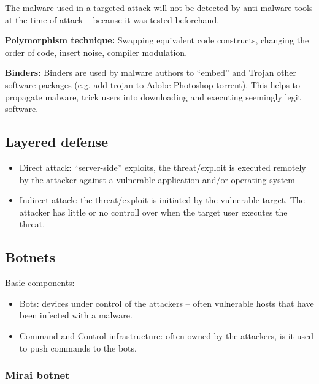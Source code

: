 \documentclass[11pt,oneside,a4paper]{article}
\begin{document}
The malware used in a targeted attack will not be detected by anti-malware tools at the time of attack – because it was tested beforehand.

\textbf{Polymorphism technique:} Swapping equivalent code constructs, changing the order of code, insert noise, compiler modulation.

\textbf{Binders:} Binders are used by malware authors to “embed” and Trojan other software packages (e.g. add trojan to Adobe Photoshop torrent). This helps to propagate malware, trick users into downloading and executing seemingly legit software. 

\subsection{Layered defense}

\vspace{-\topsep}
\begin{itemize}
	\setlength{\itemsep}{0pt}
	\setlength{\parskip}{0pt}
	\item Direct attack: “server-side” exploits, the threat/exploit is executed remotely by the attacker against a vulnerable application and/or operating system
	\item Indirect attack: the threat/exploit is initiated by the vulnerable target. The attacker has little or no controll over when the target user executes the threat.
\end{itemize}
\vspace{-\topsep}

\subsection{Botnets}

Basic components:

\vspace{-\topsep}
\begin{itemize}
	\setlength{\itemsep}{0pt}
	\setlength{\parskip}{0pt}
	\item Bots: devices under control of the attackers – often vulnerable hosts that have been
	infected with a malware.
	\item Command and Control infrastructure: often owned by the attackers, is it used to push
	commands to the bots.
\end{itemize}
\vspace{-\topsep}

\subsubsection{Mirai botnet}
\label{mirai_botnet}
\end{document}
